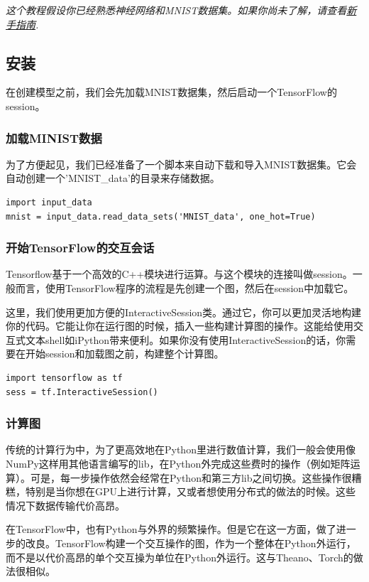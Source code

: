 \documentclass[a4paper,11pt,twoside]{ctexbook}
\begin{document}
\emph{这个教程假设你已经熟悉神经网络和MNIST数据集。如果你尚未了解，请查看\hyperref[MINIST_beginner]{新手指南}.}

\subsection {安装}
在创建模型之前，我们会先加载MNIST数据集，然后启动一个TensorFlow的session。

\subsubsection {加载MINIST数据}

为了方便起见，我们已经准备了一个脚本来自动下载和导入MNIST数据集。它会自动创建一个'MNIST\_data'的目录来存储数据。

\begin{lstlisting}
import input_data
mnist = input_data.read_data_sets('MNIST_data', one_hot=True)
\end{lstlisting}

\subsubsection {开始TensorFlow的交互会话}

Tensorflow基于一个高效的C++模块进行运算。与这个模块的连接叫做session。一般而言，使用TensorFlow程序的流程是先创建一个图，然后在session中加载它。

这里，我们使用更加方便的InteractiveSession类。通过它，你可以更加灵活地构建你的代码。它能让你在运行图的时候，插入一些构建计算图的操作。这能给使用交互式文本shell如iPython带来便利。如果你没有使用InteractiveSession的话，你需要在开始session和加载图之前，构建整个计算图。

\begin{lstlisting}
import tensorflow as tf
sess = tf.InteractiveSession()
\end{lstlisting}

\subsubsection {计算图}

传统的计算行为中，为了更高效地在Python里进行数值计算，我们一般会使用像NumPy这样用其他语言编写的lib，在Python外完成这些费时的操作（例如矩阵运算）。可是，每一步操作依然会经常在Python和第三方lib之间切换。这些操作很糟糕，特别是当你想在GPU上进行计算，又或者想使用分布式的做法的时候。这些情况下数据传输代价高昂。

在TensorFlow中，也有Python与外界的频繁操作。但是它在这一方面，做了进一步的改良。TensorFlow构建一个交互操作的图，作为一个整体在Python外运行，而不是以代价高昂的单个交互操为单位在Python外运行。这与Theano、Torch的做法很相似。
\end{document}
